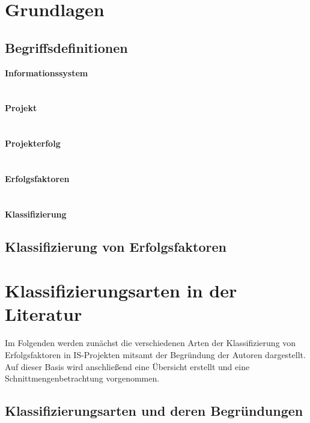 \documentclass[12pt,a4paper,oneside]{article}
\newcommand{\EF}{Erfolgsfaktoren }
\newcommand{\ISPS}{IS-Projekten }
\begin{document}
\section{Grundlagen}
\subsection{Begriffsdefinitionen}

\textbf{Informationssystem}\\\noindent
\\
\\\noindent
\textbf{Projekt}\\\noindent
\\
\\\noindent
\textbf{Projekterfolg}\\\noindent
\\
\\\noindent
\textbf{Erfolgsfaktoren}\\\noindent
\\
\\\noindent
\textbf{Klassifizierung}\\\noindent


\subsection{Klassifizierung von \EF}


\clearpage
\section{Klassifizierungsarten in der Literatur}
Im Folgenden werden zunächst die verschiedenen Arten der Klassifizierung von Erfolgsfaktoren in \ISPS mitsamt der Begründung der Autoren dargestellt.
Auf dieser Basis wird anschließend eine Übersicht erstellt und eine Schnittmengenbetrachtung vorgenommen. 
\subsection{Klassifizierungsarten und deren Begründungen}

\end{document}
